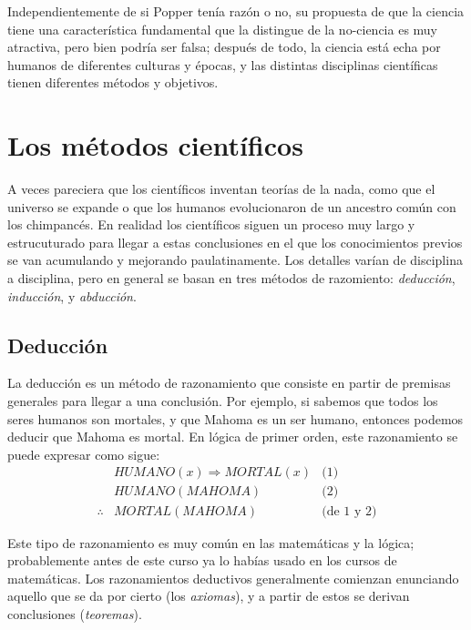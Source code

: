 Independientemente de si Popper tenía razón o no, su propuesta de que la ciencia
tiene una característica fundamental que la distingue de la no-ciencia es muy
atractiva, pero bien podría ser falsa; después de todo, la ciencia está echa por
humanos de diferentes culturas y épocas, y las distintas disciplinas científicas
tienen diferentes métodos y objetivos.

\section{Los métodos científicos}
\label{sec:losmetodoscientificos}

A veces pareciera que los científicos inventan teorías de la nada, como que el
universo se expande o que los humanos evolucionaron de un ancestro común con los
chimpancés.
En realidad los científicos siguen un proceso muy largo y estrucuturado para
llegar a estas conclusiones en el que los conocimientos previos se van
acumulando y mejorando paulatinamente.
Los detalles varían de disciplina a disciplina, pero en general se basan en tres
métodos de razomiento: \emph{deducción}, \emph{inducción}, y
\emph{abducción}.

\subsection*{Deducción}
\label{sub:deduccion}
La deducción es un método de razonamiento que consiste en partir de premisas
generales para llegar a una conclusión.
Por ejemplo, si sabemos que todos los seres humanos son mortales, y que Mahoma
es un ser humano, entonces podemos deducir que Mahoma es mortal.
En lógica de primer orden, este razonamiento se puede expresar como sigue:
\begin{align*}
               & \mathit{HUMANO}(x) \Rightarrow \mathit{MORTAL}(x) & \text{(1)}        \\
               & \mathit{HUMANO}(\mathit{MAHOMA})                  & \text{(2)}        \\
    \hline
    \therefore & \mathit{MORTAL}(\mathit{MAHOMA})                  & \text{(de 1 y 2)}
\end{align*}

Este tipo de razonamiento es muy común en las matemáticas y la lógica;
probablemente antes de este curso ya lo habías usado en los cursos de
matemáticas.
Los razonamientos deductivos generalmente comienzan enunciando aquello que se da
por cierto (los \emph{axiomas}), y a partir de estos se derivan conclusiones
(\emph{teoremas}).


